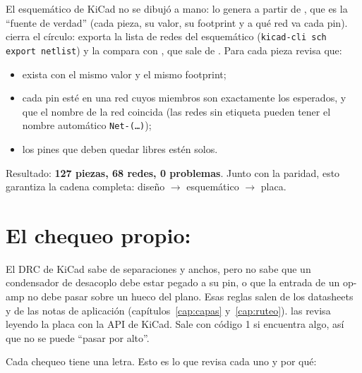 El esquemático de KiCad no se dibujó a mano: lo genera  a partir de
, que es la ``fuente de verdad'' (cada pieza, su valor, su footprint y a qué red va cada
pin).  cierra el círculo: exporta la lista de redes del esquemático
(\texttt{kicad-cli sch export netlist}) y la compara con , que sale de
. Para cada pieza revisa que:
\begin{itemize}
  \item exista con el mismo valor y el mismo footprint;
  \item cada pin esté en una red cuyos miembros son exactamente los esperados, y que el nombre de la red coincida
  (las redes sin etiqueta pueden tener el nombre automático \texttt{Net-(\ldots)});
  \item los pines que deben quedar libres estén solos.
\end{itemize}
Resultado: \textbf{127 piezas, 68 redes, 0 problemas}. Junto con la paridad, esto garantiza la cadena completa:
diseño $\to$ esquemático $\to$ placa.

\section{El chequeo propio: \texorpdfstring{}{revisar\_pistas.py}}\label{sec:c11-revisar}

El DRC de KiCad sabe de separaciones y anchos, pero no sabe que un condensador de desacoplo debe estar pegado a su
pin, o que la entrada de un op-amp no debe pasar sobre un hueco del plano. Esas reglas salen de los datasheets y de las
notas de aplicación (capítulos~\ref{cap:capas} y~\ref{cap:ruteo}).  las
revisa leyendo la placa con la API de KiCad. Sale con código 1 si encuentra algo, así que no se puede ``pasar por
alto''.

Cada chequeo tiene una letra. Esto es lo que revisa cada uno y por qué:


